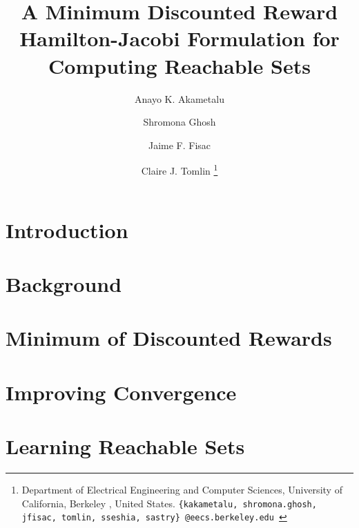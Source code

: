 \documentclass[letterpaper, 10 pt, journal]{ieeeconf}
\title{\LARGE \bf
A Minimum Discounted Reward Hamilton-Jacobi Formulation for Computing Reachable Sets 
}
\author{
Anayo K. Akametalu \and Shromona Ghosh \and Jaime F. Fisac \and Claire J. Tomlin
\thanks{
 Department of Electrical Engineering and Computer Sciences, 
        University of California, Berkeley , United States.\newline
        {\tt\small \{kakametalu, shromona.ghosh, jfisac, tomlin, sseshia, sastry\}~@eecs.berkeley.edu }}%
}
\begin{document}
\maketitle
\thispagestyle{empty}
\pagestyle{empty}



\section{Introduction \label{sec:intro}}


\section{Background \label{sec:back}} 


\section {Minimum of Discounted Rewards \label{sec:mdr}}


\section{Improving Convergence \label{sec:conv}}


\section{Learning Reachable Sets \label{sec:learn}}

\end{document}
